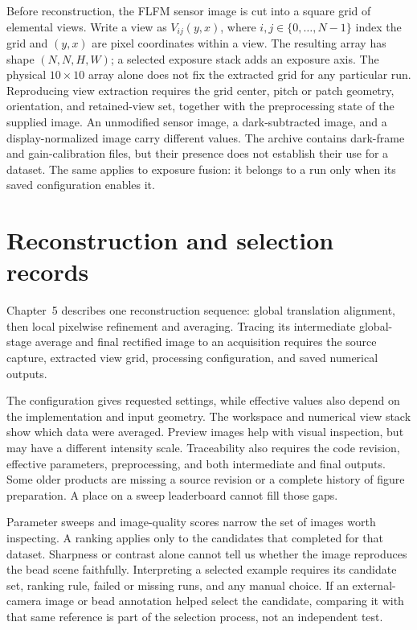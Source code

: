 Before reconstruction, the FLFM sensor image is cut into a square grid of
elemental views. Write a view as $V_{ij}(y,x)$, where
$i,j\in\{0,\ldots,N-1\}$ index the grid and $(y,x)$ are pixel coordinates
within a view. The resulting array has shape $(N,N,H,W)$; a selected exposure
stack adds an exposure axis. The physical $10\times10$ array alone does not
fix the extracted grid for any particular run. Reproducing view extraction
requires the grid center, pitch or patch geometry, orientation, and retained-view
set, together with the preprocessing state of the supplied image. An unmodified
sensor
image, a dark-subtracted image, and a display-normalized image carry different
values. The archive contains dark-frame and gain-calibration files, but their
presence does not establish their use for a dataset. The same applies to
exposure fusion:
it belongs to a run only when its saved configuration enables it.

\section{Reconstruction and selection records}
\label{sec:reconstruction-records}

Chapter~5 describes one reconstruction sequence: global translation
alignment, then local pixelwise refinement and averaging. Tracing its
intermediate global-stage average and final rectified image to an acquisition
requires the source capture, extracted view grid, processing configuration,
and saved numerical outputs.

The configuration gives requested settings, while effective values also depend
on the implementation and input geometry. The workspace and numerical view
stack show which data were averaged. Preview images help with visual
inspection, but may have a different intensity scale. Traceability also
requires the code revision, effective parameters, preprocessing, and both
intermediate and final outputs. Some older products are missing a source
revision or a complete history of figure preparation.
A place on a sweep leaderboard cannot fill those gaps.

Parameter sweeps and image-quality scores narrow the set of images worth
inspecting. A ranking applies only to the candidates that completed for that
dataset. Sharpness or contrast alone cannot tell us whether the image
reproduces the bead scene faithfully. Interpreting a selected example requires
its candidate set, ranking rule, failed or missing runs, and any manual choice.
If an external-camera image or bead annotation helped
select the candidate, comparing it with that same reference is part of the
selection process, not an independent test.

